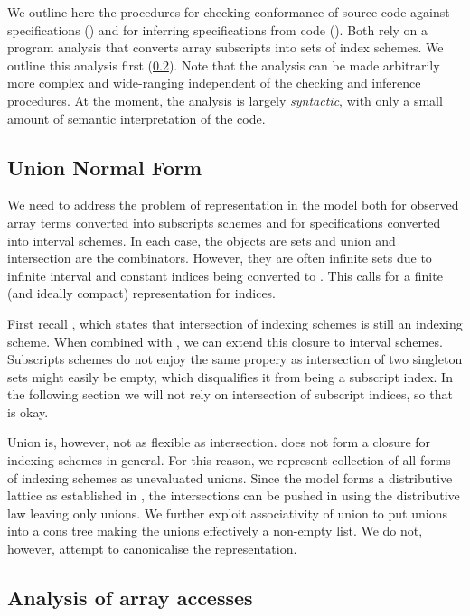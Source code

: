 %
We outline here the procedures for checking conformance
of source code against specifications ()
and for inferring specifications from code ().
Both rely on a program analysis that converts array subscripts
 into sets of index schemes. We outline this analysis
first (\cref{subsec:analysis}). Note that the analysis
can be made arbitrarily more complex and wide-ranging independent
of the checking and inference procedures. At the moment, the analysis
is largely \emph{syntactic}, with only a small amount of
semantic interpretation of the code.

\subsection{Union Normal Form}\label{subsec:union-normal-form}

We need to address the problem of representation in the model both for observed
array terms converted into subscripts schemes and for specifications converted
into interval schemes. In each case, the objects are sets and union and
intersection are the combinators. However, they are often infinite sets due to
infinite interval and constant indices being converted to \bz{}. This calls for
a finite (and ideally compact) representation for indices.

First recall , which states that intersection of
indexing schemes is still an indexing scheme. When combined with
, we can extend this closure to interval schemes.
Subscripts schemes do not enjoy the same propery as intersection of two
singleton sets might easily be empty, which disqualifies it from being a
subscript index. In the following section we will not rely on intersection of
subscript indices, so that is okay.

Union is, however, not as flexible as intersection.  does
not form a closure for indexing schemes in general. For this reason, we
represent collection of all forms of indexing schemes as unevaluated unions.
Since the model forms a distributive lattice as established in
, the intersections can be pushed in using the
distributive law leaving only unions. We further exploit associativity of union
to put unions into a cons tree making the unions effectively a non-empty list.
We do not, however, attempt to canonicalise the representation.


\subsection{Analysis of array accesses}
\label{subsec:analysis}

